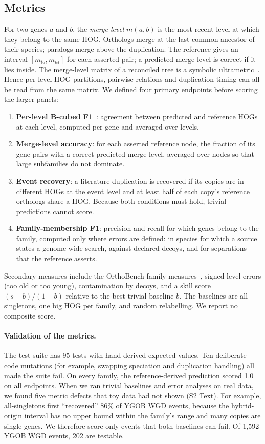 \subsection*{Metrics}
For two genes $a$ and $b$, the \emph{merge level} $m(a,b)$ is the most recent level at which they belong to the same
HOG. Orthologs merge at the last common ancestor of their species; paralogs merge above the duplication. The reference
gives an interval $[m_{lo}, m_{hi}]$ for each asserted pair; a predicted merge level is correct if it lies inside. The
merge-level matrix of a reconciled tree is a symbolic ultrametric~\cite{hellmuth2013cograph,lafond2014orthology}.
Hence per-level HOG partitions, pairwise relations and duplication timing can all be read from the same matrix. We defined
four primary endpoints before scoring the larger panels:
\begin{enumerate}
\item \textbf{Per-level B-cubed F1}~\cite{amigo2009bcubed}: agreement between predicted and reference HOGs at each
level, computed per gene and averaged over levels.
\item \textbf{Merge-level accuracy}: for each asserted reference node, the fraction of its gene pairs with a correct
predicted merge level, averaged over nodes so that large subfamilies do not dominate.
\item \textbf{Event recovery}: a literature duplication is recovered if its copies are in different HOGs at the event
level and at least half of each copy's reference orthologs share a HOG. Because both conditions must hold, trivial
predictions cannot score.
\item \textbf{Family-membership F1}: precision and recall for which genes belong to the family, computed only where
errors are defined: in species for which a source states a genome-wide search, against declared decoys, and for separations that
the reference asserts.
\end{enumerate}
Secondary measures include the OrthoBench family measures~\cite{emms2020orthobench}, signed level errors (too old or
too young), contamination by decoys, and a skill score $(s-b)/(1-b)$ relative to the best trivial baseline $b$. The
baselines are all-singletons, one big HOG per family, and random relabelling. We report no composite score.

\paragraph{Validation of the metrics.} The test suite has 95 tests with hand-derived expected values. Ten deliberate
code mutations (for example, swapping speciation and duplication handling) all made the suite fail. On every family,
the reference-derived prediction scored 1.0 on all endpoints. When we ran trivial baselines and error analyses on real
data, we found five metric defects that toy data had not shown (S2 Text). For example, all-singletons first ``recovered'' 86\% of YGOB WGD
events, because the hybrid-origin interval has no upper bound within the family's range and many copies are single
genes. We therefore score only events that both baselines can fail. Of 1,592 YGOB WGD events, 202 are testable.

